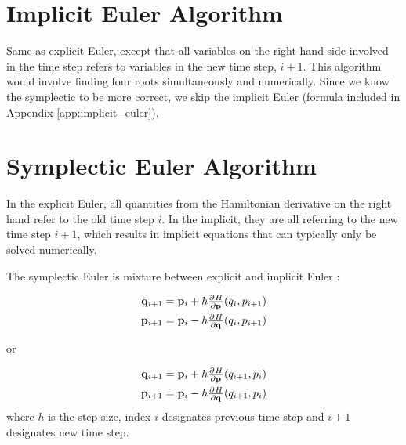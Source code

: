 \section{Implicit Euler Algorithm}
Same as explicit Euler, except that all variables on the right-hand side involved in the time step refers to variables in the new time step, $i+1$. This algorithm would involve finding four roots simultaneously and numerically. Since we know the symplectic to be more correct, we skip the implicit Euler (formula included in Appendix \ref{app:implicit_euler}).

\section{Symplectic Euler Algorithm}
In the explicit Euler, all quantities from the Hamiltonian derivative on the right hand refer to the old time step \(i\). In the implicit, they are all referring to the new time step \(i+1\), which results in implicit equations that can typically only be solved numerically.

The symplectic Euler is mixture between explicit and implicit Euler \cite{Hairer}:

\begin{equation}
    \begin{split} \label{eq:symplectic-euler1}
        \vec{q}_{i+1} = \vec{p}_i + h \pd{H}{\vec{p}}(q_i, p_{i+1}) \\
        \vec{p}_{i+1} = \vec{p}_i - h \pd{H}{\vec{q}}(q_i, p_{i+1})
    \end{split}
\end{equation}

or

\begin{equation}
    \begin{split} \label{eq:symplectic-euler2}
        \vec{q}_{i+1} = \vec{p}_i + h \pd{H}{\vec{p}}(q_{i+1}, p_i) \\
        \vec{p}_{i+1} = \vec{p}_i - h \pd{H}{\vec{q}}(q_{i+1}, p_i)
    \end{split}
\end{equation}
where \(h\) is the step size, index \(i\) designates previous time step and \(i+1\) designates new time step.

